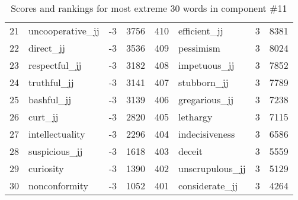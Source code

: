 \begin{table}[tbp]
\begin{tabular}{| rlr@{.}l | rlr@{.}l |}
    21 & uncooperative\_jj & -3 & 3756    &    410 & efficient\_jj & 3 & 8381 \\
    22 & direct\_jj & -3 & 3536    &    409 & pessimism & 3 & 8024 \\
    23 & respectful\_jj & -3 & 3182    &    408 & impetuous\_jj & 3 & 7852 \\
    24 & truthful\_jj & -3 & 3141    &    407 & stubborn\_jj & 3 & 7789 \\
    25 & bashful\_jj & -3 & 3139    &    406 & gregarious\_jj & 3 & 7238 \\
    26 & curt\_jj & -3 & 2820    &    405 & lethargy & 3 & 7115 \\
    27 & intellectuality & -3 & 2296    &    404 & indecisiveness & 3 & 6586 \\
    28 & suspicious\_jj & -3 & 1618    &    403 & deceit & 3 & 5559 \\
    29 & curiosity & -3 & 1390    &    402 & unscrupulous\_jj & 3 & 5129 \\
    30 & nonconformity & -3 & 1052    &    401 & considerate\_jj & 3 & 4264 \\
    \hline
    \end{tabular}
    \caption{Scores and rankings for most extreme 30 words in component \#11} 
\end{table}
\clearpage
